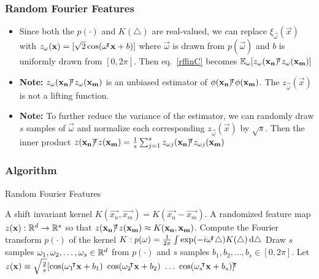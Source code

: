 \documentclass[10pt]{../formats/RU}
\begin{document}
\begin{frame}
  \frametitle{Random Fourier Features}
  \begin{itemize}
    \item <1-> Since both the $p(\cdot)$ and $K(\triangle)$ are real-valued, we can replace $\xi_{\vec{\omega}}(\vec{x})$ with $z_{\mathbf{\omega}}(\mathbf{x})=[\sqrt{2}\cos(\mathbf{\omega}{}^{\mkern-4mu\intercal}\mathbf{x}+b)]$ where $\vec{\omega}$ is drawn from $p(\vec{\omega})$ and $b$ is uniformly drawn from $[0, 2\pi]$. Then eq.~\eqref{rffinC} becomes $\mathbb{E}_{\mathbf{\omega}}[z_{\mathbf{\omega}}(\mathbf{x_n}){}^{\mkern-4mu\intercal} z_{\mathbf{\omega}}(\mathbf{x_m})]$
    \item <2-> \textbf{Note:} $z_{\mathbf{\omega}}(\mathbf{x_n}){}^{\mkern-4mu\intercal} z_{\mathbf{\omega}}(\mathbf{x_m})$ is an unbiased estimator of $\phi(\mathbf{x_n}){}^{\mkern-4mu\intercal}\phi(\mathbf{x_m})$. The $z_{\vec{\omega}}(\vec{x})$ is not a lifting function.
    \item <3-> \textbf{Note:} To further reduce the variance of the estimator, we can randomly draw $s$ samples of $\vec{\omega}$ and normalize each corresponding $z_{\vec{\omega}}(\vec{x})$ by $\sqrt{s}$. Then the inner product $z(\mathbf{x_n}){}^{\mkern-4mu\intercal} z(\mathbf{x_m})=\frac{1}{s}\sum_{j=1}^{s}z_{\mathbf{\omega}j}(\mathbf{x_n}){}^{\mkern-4mu\intercal} z_{\mathbf{\omega}j}(\mathbf{x_m})$
  \end{itemize}
\end{frame}
\begin{frame}
  \frametitle{Algorithm}
  \begin{algorithm}[H]
    \caption{Random Fourier Features}\label{RFF}
    \begin{algorithmic}
    \Require A shift invariant kernel $K(\vec{x_n}, \vec{x_m}) = K(\vec{x_n}- \vec{x_m})$.
    \Ensure A randomized feature map $z(\mathbf{x}): \mathbb{R}^d\rightarrow\mathbb{R}^s$ so that $z(\mathbf{x_n}){}^{\mkern-4mu\intercal} z(\mathbf{x_m})\approx K(\mathbf{x_n}, \mathbf{x_m})$.
    \State Compute the Fourier transform $p(\cdot)$ of the kernel $K: p(\mathbf{\omega})=\frac{1}{2\pi}\int \exp(-i\mathbf{\omega}{}^{\mkern-4mu\intercal}\triangle)K(\triangle)\mathop{}\!\mathrm{d}\triangle$ 
    \State Draw $s$ \iid samples $\mathbf{\omega}_1, \mathbf{\omega}_2, \ldots, \mathbf{\omega}_s \in \mathbb{R}^d$ from $p(\cdot)$ and $s$ \iid samples $b_1, b_2, \ldots, b_s \in [0, 2\pi]$.
    \State Let $z(\vec{x})\equiv \sqrt{\frac{2}{s}}[\cos(\vec{\omega}_1\trn\vec{x}+b_1)\ \cos(\vec{\omega}_2\trn\vec{x}+b_2)\ \ldots\ \cos(\vec{\omega}_s\trn\vec{x}+b_s)]\trn$   
    \end{algorithmic}
  \end{algorithm}
\end{frame}
\end{document}
